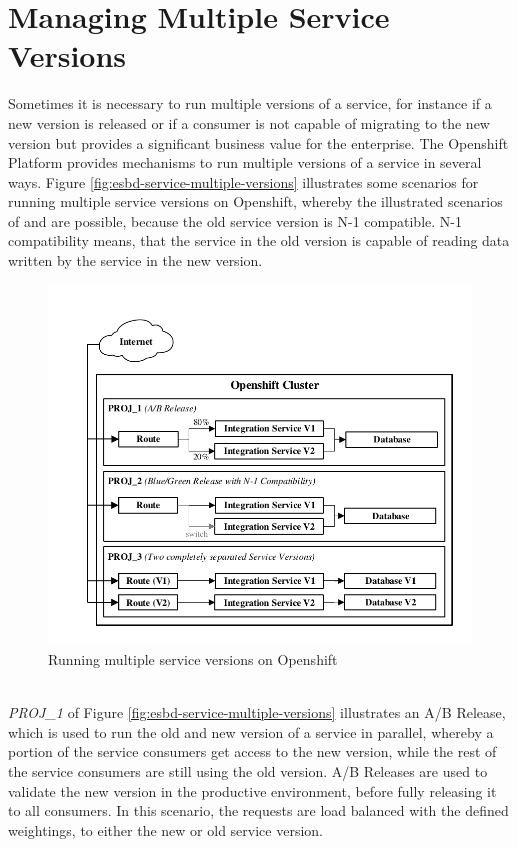 \section{Managing Multiple Service Versions}
\label{sec:esbd-multi-version-service}
Sometimes it is necessary to run multiple versions of a service, for instance if a new version is released or if a consumer is not capable of migrating to the new version but provides a significant business value for the enterprise. The Openshift Platform provides mechanisms to run multiple versions of a service in several ways. Figure \vref{fig:esbd-service-multiple-versions} illustrates some scenarios for running multiple service versions on Openshift, whereby the illustrated scenarios of  and  are possible, because the old service version is N-1 compatible. N-1 compatibility means, that the service in the old version is capable of reading data written by the service in the new version. \\

\begin{figure}[htbp]
	\centering
	\includegraphics[scale=1]{images/esbd-service-multiple-versions.pdf}
	\caption{Running multiple service versions on Openshift}
	\label{fig:esbd-service-multiple-versions}
\end{figure}
\ \\
\emph{PROJ\_1} of Figure \vref{fig:esbd-service-multiple-versions} illustrates an A/B Release, which is used to run the old and new version of a service in parallel, whereby a portion of the service consumers get access to the new version, while the rest of the service consumers are still using the old version. A/B Releases are used to validate the new version in the productive environment, before fully releasing it to all consumers. In this scenario, the requests are load balanced with the defined weightings, to either the new or old service version. \\ 

